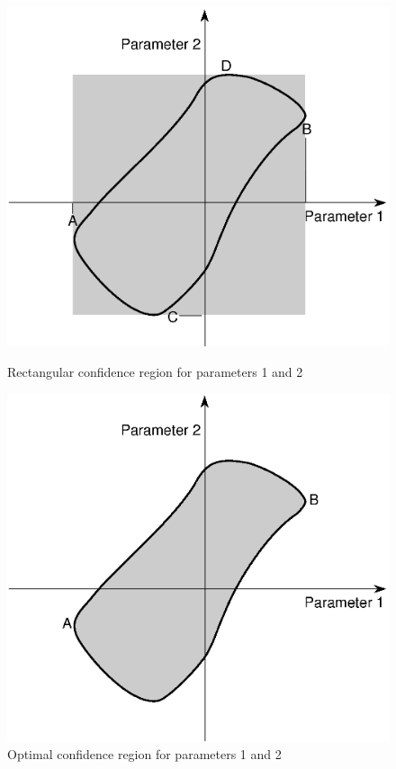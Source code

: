 \begin{figure}[ht]
\begin{minipage}{.49\linewidth}
\includegraphics[width=\linewidth]{minosco2.eps}
\caption{Rectangular confidence region for parameters 1 and 2}
\label{fig:MINosconf2}
\end{minipage}\hfill
\begin{minipage}{.49\linewidth}
\includegraphics[width=\linewidth]{minosco3.eps}
\caption{Optimal confidence region for parameters 1 and 2}
\label{fig:MINosconf3}
\end{minipage}
\end{figure}

